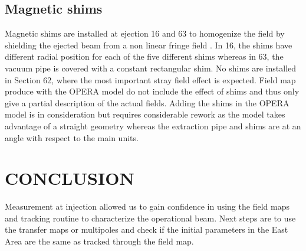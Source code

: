 \documentclass[a4paper,
               biblatex,     %
               keeplastbox,   %
               ]{jacow}
\begin{document}
\subsection{Magnetic shims}

Magnetic shims are installed at ejection 16 and 63 to homogenize the field by shielding the ejected beam from a non linear fringe field \cite{zickler_influence_nodate}. In 16, the shims have different radial position for each of the five different shims whereas in 63, the vacuum pipe is covered with a constant rectangular shim. No shims are installed in Section 62, where the most important stray field effect is expected. Field map produce with the OPERA model do not include the effect of shims and thus only give a partial description of the actual fields. Adding the shims in the OPERA model is in consideration but requires considerable rework as the model takes advantage of a straight geometry whereas the extraction pipe and shims are at an angle with respect to the main units.


\section{CONCLUSION}
Measurement at injection allowed us to gain confidence in using the field maps and tracking routine to characterize the operational beam. Next steps are to use the transfer maps or multipoles and check if the initial parameters in the East Area are the same as tracked through the field map.

\printbibliography
\end{document}
